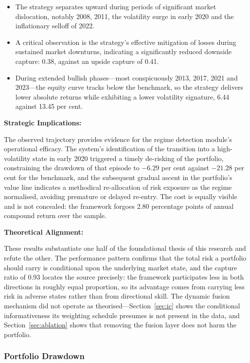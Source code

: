 \begin{itemize}
\item The strategy separates upward during periods of significant market dislocation,
notably 2008, 2011, the volatility surge in early 2020 and the inflationary selloff of
2022.
\item A critical observation is the strategy's effective mitigation of losses during
sustained market downturns, indicating a significantly reduced downside capture: 0.38,
against an upside capture of 0.41.
\item During extended bullish phases---most conspicuously 2013, 2017, 2021 and
2023---the equity curve tracks below the benchmark, so the strategy delivers lower
absolute returns while exhibiting a lower volatility signature, 6.44 against 13.45 per
cent.
\end{itemize}

\textbf{Strategic Implications:}

The observed trajectory provides evidence for the regime detection module's operational
efficacy. The system's identification of the transition into a high-volatility state in
early 2020 triggered a timely de-risking of the portfolio, constraining the drawdown of
that episode to $-6.29$ per cent against $-21.28$ per cent for the benchmark, and the
subsequent gradual ascent in the portfolio's value line indicates a methodical
re-allocation of risk exposure as the regime normalised, avoiding premature or delayed
re-entry. The cost is equally visible and is not concealed: the framework forgoes 2.80
percentage points of annual compound return over the sample.

\textbf{Theoretical Alignment:}

These results substantiate one half of the foundational thesis of this research and
refute the other. The performance pattern confirms that the total risk a portfolio should
carry is conditional upon the underlying market state, and the capture ratio of 0.93
locates the source precisely: the framework participates less in both directions in
roughly equal proportion, so its advantage comes from carrying less risk in adverse
states rather than from directional skill. The dynamic fusion mechanism did not operate as
theorised---Section~\ref{sec:ic} shows the conditional informativeness its weighting
schedule presumes is not present in the data, and Section~\ref{sec:ablation} shows that
removing the fusion layer does not harm the portfolio.

\subsubsection{Portfolio Drawdown}

